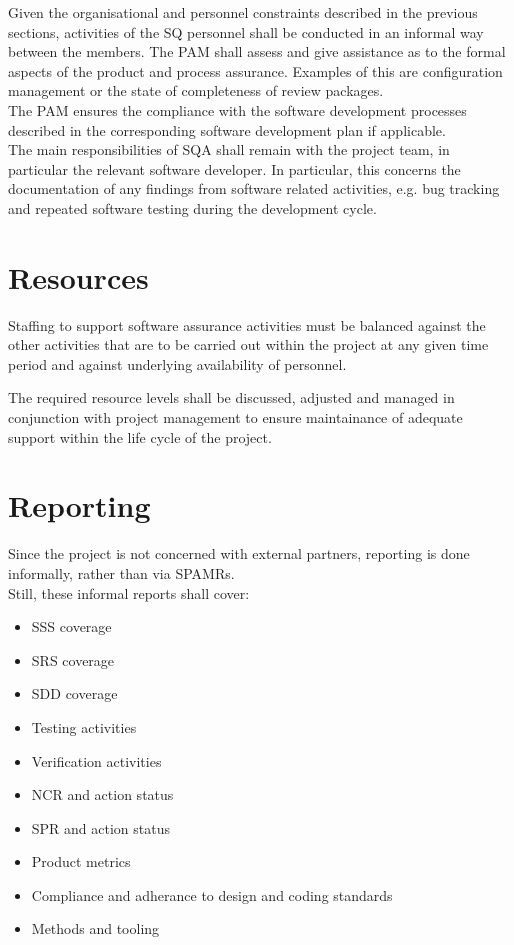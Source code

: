 \noindent
Given the organisational and personnel constraints described in the previous
sections, activities of the \gls{SQ} personnel shall be conducted in an informal
way between the members. The \gls{PAM} shall assess and give assistance as to
the formal aspects of the product and process assurance. Examples of this
are configuration management or the state of completeness of review packages.\\

\noindent
The \gls{PAM} ensures the compliance with the software development processes
described in the corresponding software development plan if applicable.\\

\noindent
The main responsibilities of \gls{SQA} shall remain with the project team, in
particular the relevant software developer. In particular, this concerns
the documentation of any findings from software related activities, e.g. bug
tracking and repeated software testing during the development cycle.



\section{Resources}

Staffing to support software assurance activities must be balanced against the
other activities that are to be carried out within the project at any given time
period and against underlying availability of personnel.

The required resource levels shall be discussed, adjusted and managed in
conjunction with project management to ensure maintainance of adequate support
within the life cycle of the project.


\section{Reporting}

Since the project is not concerned with external partners, reporting is done
informally, rather than via \glspl{SPAMR}.\\

\noindent
Still, these informal reports shall cover:

\begin{itemize}
	\item \gls{SSS} coverage
	\item \gls{SRS} coverage
	\item \gls{SDD} coverage
	\item Testing activities
	\item Verification activities
	\item \gls{NCR} and action status
	\item \gls{SPR} and action status
	\item Product metrics
	\item Compliance and adherance to design and coding standards
	\item Methods and tooling
\end{itemize}

